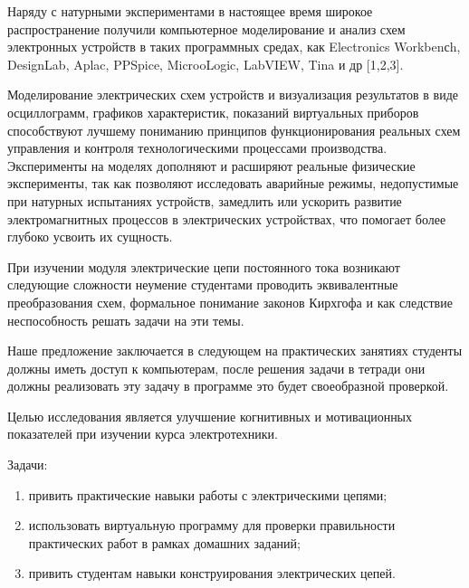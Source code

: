  

\makeProcTitle
{}

Наряду с натурными экспериментами в настоящее время широкое распространение получили компьютерное моделирование и анализ схем электронных устройств в таких программных средах, как Electronics Workbenсh, DesignLab, Aplac, PPSpice, MicrooLogic, LabVIEW, Tina и др [1,2,3].

Моделирование электрических схем устройств и визуализация результатов в виде осциллограмм, графиков характеристик, показаний виртуальных приборов способствуют лучшему пониманию принципов функционирования реальных схем управления и контроля технологическими процессами производства. Эксперименты на моделях дополняют и расширяют реальные физические эксперименты, так как позволяют исследовать аварийные режимы, недопустимые при натурных испытаниях устройств, замедлить или ускорить развитие электромагнитных процессов в электрических устройствах, что помогает более глубоко усвоить их сущность.

При изучении модуля электрические цепи постоянного тока возникают следующие сложности неумение студентами проводить эквивалентные преобразования схем, формальное понимание законов Кирхгофа и как следствие неспособность решать задачи на эти темы.

Наше предложение заключается в следующем на практических занятиях студенты должны иметь доступ к компьютерам, после решения задачи в тетради они должны реализовать эту задачу в программе это будет своеобразной проверкой.

Целью исследования является улучшение когнитивных и мотивационных показателей при изучении курса электротехники.

Задачи:

\begin{enumerate}[noitemsep]\vspace{-8pt}
    \item привить практические навыки работы с электрическими цепями;
    \item использовать виртуальную программу для проверки правильности
    практических работ в рамках домашних заданий;
    \item привить студентам навыки конструирования электрических цепей.
\end{enumerate}
 \vspace{-8pt}

